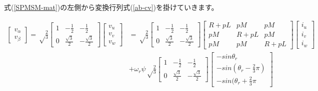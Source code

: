 \begin{fleqn}[8pt]
式(\ref{SPMSM-mat})の左側から変換行列式(\ref{ab-cv})を掛けていきます。
{\large
\begin{align*}
    \begin{bmatrix}
        v_{\alpha} \\
        v_{\beta}
    \end{bmatrix}
    = \sqrt\frac{2}{3}
    \begin{bmatrix}
        1 & -\frac{1}{2} & -\frac{1}{2} \\
        0 & \frac{\sqrt{3}}{2} & -\frac{\sqrt{3}}{2}
    \end{bmatrix}
    \begin{bmatrix}
        v_{u} \\
        v_{v} \\
        v_{w}
    \end{bmatrix}
    &= \sqrt\frac{2}{3}
    \begin{bmatrix}
        1 & -\frac{1}{2} & -\frac{1}{2} \\
        0 & \frac{\sqrt{3}}{2} & -\frac{\sqrt{3}}{2}
    \end{bmatrix}
    \begin{bmatrix}
        R+pL & pM & pM \\
        pM & R+pL & pM \\
        pM & pM & R+pL
    \end{bmatrix}
    \begin{bmatrix}
        i_{u} \\
        i_{v} \\
        i_{w}
    \end{bmatrix}
    \\
    &+ \omega_{r}\psi
    \sqrt\frac{2}{3}
    \begin{bmatrix}
        1 & -\frac{1}{2} & -\frac{1}{2} \\
        0 & \frac{\sqrt{3}}{2} & -\frac{\sqrt{3}}{2}
    \end{bmatrix}
    \begin{bmatrix}
        -sin\theta_{r} \\
        -sin(\theta_{r} - \frac{2}{3}\pi) \\
        -sin(\theta_{r} + \frac{2}{3}\pi
    \end{bmatrix}
\end{align*}

}
\end{fleqn}
